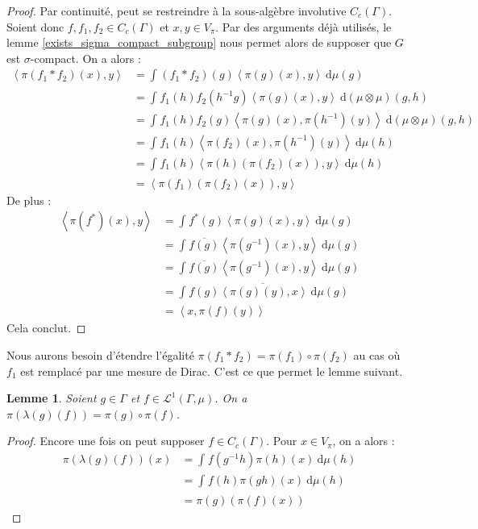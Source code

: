 \documentclass[a4paper,12pt]{article}
\newtheorem{lemma}[theorem]{Lemme}
\newcommand{\ket}[1]{\left\langle #1 \right\rangle}
\newcommand{\integral}[4]{\int_{#1}^{#2} #3~\mathrm{d}#4}
\newcommand{\inv}{^{-1}}
\newcommand{\comp}{\circ}
\begin{document}
\begin{proof}
    Par continuité, peut se restreindre à la sous-algèbre involutive $C_c(\Gamma)$. Soient donc $f, f_1, f_2\in C_c(\Gamma)$ et $x, y\in V_\pi$. 
    Par des arguments déjà utilisés, le lemme \ref{exists_sigma_compact_subgroup} nous permet alors de supposer que $G$ est $\sigma$-compact. 
    On a alors :
    \begin{align*}
        \ket{\pi(f_1\ast f_2)(x), y}
            &= \integral{}{}{(f_1\ast f_2)(g)\ket{\pi(g)(x), y}}{\mu(g)} \\
            &= \integral{}{}{f_1(h)f_2(h\inv g)\ket{\pi(g)(x), y}}{(\mu\otimes\mu)(g, h)} \\
            &= \integral{}{}{f_1(h)f_2(g)\ket{\pi(g)(x), \pi(h\inv)(y)}}{(\mu\otimes\mu)(g, h)} \\
            &= \integral{}{}{f_1(h)\ket{\pi(f_2)(x), \pi(h\inv)(y)}}{\mu(h)} \\
            &= \integral{}{}{f_1(h)\ket{\pi(h)(\pi(f_2)(x)), y}}{\mu(h)} \\
            &= \ket{\pi(f_1)(\pi(f_2)(x)), y}
    \end{align*}
    De plus :
    \begin{align*}
        \ket{\pi(f^*)(x), y}
            &= \integral{}{}{f^*(g)\ket{\pi(g)(x), y}}{\mu(g)} \\
            &= \integral{}{}{\overline{f(g)}\ket{\pi(g\inv)(x), y}}{\mu(g)} \\
            &= \integral{}{}{\overline{f(g)}\ket{\pi(g\inv)(x), y}}{\mu(g)} \\
            &= \overline{\integral{}{}{f(g)\ket{\pi(g)(y), x}}{\mu(g)}} \\
            &= \ket{x, \pi(f)(y)}
    \end{align*}
    Cela conclut.
\end{proof}

Nous aurons besoin d'étendre l'égalité $\pi(f_1\ast f_2) = \pi(f_1)\comp\pi(f_2)$ 
au cas où $f_1$ est remplacé par une mesure de Dirac. C'est ce que permet le lemme suivant.

\begin{lemma}\label{L1_repr_translate}
    Soient $g \in\Gamma$ et $f\in\mathscr{L}^1(\Gamma, \mu)$. On a $\pi(\lambda(g)(f)) = \pi(g)\comp\pi(f)$.
\end{lemma}

\begin{proof}
    Encore une fois on peut supposer $f\in C_c(\Gamma)$. Pour $x\in V_\pi$, on a alors :
    \begin{align*}
        \pi(\lambda(g)(f))(x) 
            &= \integral{}{}{f(g\inv h)\pi(h)(x)}{\mu(h)} \\
            &= \integral{}{}{f(h)\pi(gh)(x)}{\mu(h)} \\
            &= \pi(g)(\pi(f)(x))
    \end{align*}
\end{proof}
\end{document}
